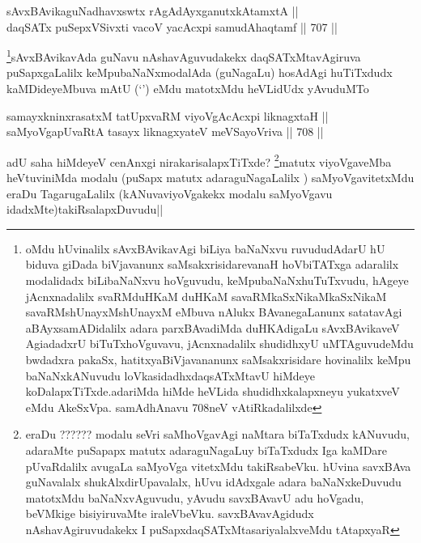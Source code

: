 
\begin{shl}
sAvxBAvikaguNadhavxswtx rAgAdAyxganutxkAtamxtA ||  \\
daqSATx puSepxVSivxti vacoV yacAcxpi samudAhaqtamf ||  707 ||  
\end{shl}

\begin{artha}
\footnote{oMdu hUvinalilx sAvxBAvikavAgi biLiya baNaNxvu ruvududAdarU hU biduva giDada biVjavanunx saMsakxrisidarevanaH hoVbiTATxga adaralilx modalidadx biLibaNaNxvu hoVguvudu, keMpubaNaNxhuTuTxvudu, hAgeye jAcnxnadalilx svaRMduHKaM duHKaM savaRMkaSxNikaMkaSxNikaM savaRMshUnayxMshUnayxM eMbuva nAlukx BAvanegaLanunx satatavAgi aBAyxsamADidalilx adara parxBAvadiMda duHKAdigaLu sAvxBAvikaveV AgiadadxrU biTuTxhoVguvavu, jAcnxnadalilx shudidhxyU uMTAguvudeMdu bwdadxra pakaSx, hatitxyaBiVjavananunx saMsakxrisidare hovinalilx keMpu baNaNxkANuvudu loVkasidadhxdaqsATxMtavU hiMdeye koDalapxTiTxde.adariMda hiMde heVLida shudidhxkalapxneyu yukatxveV eMdu AkeSxVpa. samAdhAnavu 708neV vAtiRkadalilxde}sAvxBAvikavAda guNavu nAshavAguvudakekx daqSATxMtavAgiruva puSapxgaLalilx keMpubaNaNxmodalAda (guNagaLu) hosAdAgi huTiTxdudx kaMDideyeMbuva mAtU (`\stext') eMdu matotxMdu heVLidUdx yAvuduMTo
\end{artha}

\begin{shl}
samayxkninxrasatxM tatUpxvaRM viyoVgAcAcxpi liknagxtaH || \\
saMyoVgapUvaRtA tasayx liknagxyateV meVSayoVriva ||  708 ||  
\end{shl}

\begin{artha}
adU saha hiMdeyeV cenAnxgi nirakarisalapxTiTxde? \footnote{eraDu ?????? modalu seVri saMhoVgavAgi naMtara biTaTxdudx kANuvudu, adaraMte puSapapx matutx adaraguNagaLuy biTaTxdudx Iga kaMDare pUvaRdalilx avugaLa saMyoVga vitetxMdu takiRsabeVku. hUvina savxBAva guNavalalx shukAlxdirUpavalalx, hUvu idAdxgale adara baNaNxkeDuvudu matotxMdu baNaNxvAguvudu, yAvudu savxBAvavU adu hoVgadu, beVMkige bisiyiruvaMte iraleVbeVku. savxBAvavAgidudx nAshavAgiruvudakekx I puSapxdaqSATxMtasariyalalxveMdu tAtapxyaR}matutx viyoVgaveMba heVtuviniMda modalu (puSapx matutx adaraguNagaLalilx ) saMyoVgavitetxMdu eraDu TagarugaLalilx (kANuvaviyoVgakekx modalu saMyoVgavu idadxMte)takiRsalapxDuvudu||
\end{artha}


